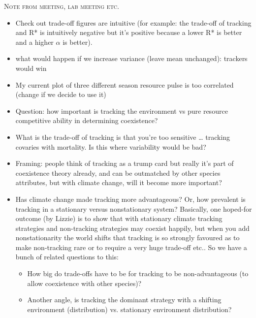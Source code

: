 \documentclass[11pt,letterpaper]{article}
\renewcommand{\section}[1]{%
\bigskip
\begin{center}
\begin{Large}
\normalfont\scshape #1
\medskip
\end{Large}
\end{center}}
\begin{document}
\section{Note from meeting, lab meeting etc.}
\begin{itemize}
\item Check out trade-off figures are intuitive (for example: the trade-off of tracking and R* is intuitively negative but it's positive because a lower R* is better and a higher $\alpha$ is better).
\item what would happen if we increase variance (leave mean unchanged): trackers would win
\item My current plot of three different season resource pulse is too correlated  (change if we decide to use it)
\item Question: how important is tracking the environment vs pure resource competitive ability in determining coexistence? 
\item What is the trade-off of tracking is that you’re too sensitive … tracking covaries with mortality. Is this where variability would be bad? 
\item Framing: people think of tracking as a trump card but really it’s part of coexistence theory already, and can be outmatched by other species attributes, but with climate change, will it become more important?
\end{itemize}

\begin{itemize}
\item Has climate change made tracking more advantageous? Or, how prevalent is tracking in a stationary versus nonstationary system? Basically, one hoped-for outcome (by Lizzie) is to show that with stationary climate tracking strategies and non-tracking strategies may coexist happily, but when you add nonstationarity the world shifts that tracking is so strongly favoured as to make non-tracking rare or to require a very huge trade-off etc.. So we have a bunch of related questions to this:
\begin{itemize}
\item How big do trade-offs have to be for tracking to be non-advantageous (to allow coexistence with other species)?
\item Another angle, is tracking the dominant strategy with a shifting environment (distribution) vs. stationary environment distribution?
\end{itemize}
\end{itemize}
\end{document}

